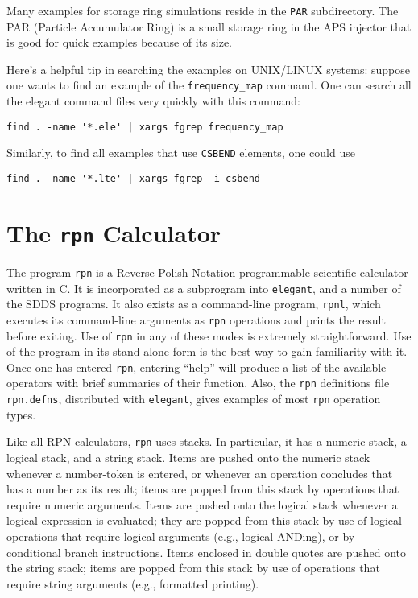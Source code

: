 \documentclass[11pt]{article}
\begin{document}
Many examples for storage ring simulations reside in the {\tt PAR} subdirectory.
The PAR (Particle Accumulator Ring) is a small storage ring in the APS injector
that is good for quick examples because of its size.

Here's a helpful tip in searching the examples on UNIX/LINUX systems: suppose one wants
to find an example of the \verb|frequency_map| command.  One can search all the elegant
command files very quickly with this command:
\begin{verbatim}
find . -name '*.ele' | xargs fgrep frequency_map
\end{verbatim}
Similarly, to find all examples that use \verb|CSBEND| elements, one could use
\begin{verbatim}
find . -name '*.lte' | xargs fgrep -i csbend
\end{verbatim}



\newpage
\section{The {\tt rpn} Calculator}

The program {\tt rpn} is a Reverse Polish Notation programmable
scientific calculator written in C.  It is incorporated as a
subprogram into {\tt elegant}, and a number of the SDDS programs.  It
also exists as a command-line program, {\tt rpnl}, which executes its
command-line arguments as {\tt rpn} operations and prints the result
before exiting.  Use of {\tt rpn} in any of these modes is extremely
straightforward.  Use of the program in its stand-alone form is the
best way to gain familiarity with it.  Once one has entered {\tt rpn},
entering ``help'' will produce a list of the available operators with
brief summaries of their function.  Also, the {\tt rpn} definitions
file \verb|rpn.defns|, distributed with {\tt elegant}, gives examples
of most {\tt rpn} operation types.

Like all RPN calculators, {\tt rpn} uses stacks.  In particular, it
has a numeric stack, a logical stack, and a string stack.  Items are
pushed onto the numeric stack whenever a number-token is entered, or
whenever an operation concludes that has a number as its result; items
are popped from this stack by operations that require numeric
arguments.  Items are pushed onto the logical stack whenever a logical
expression is evaluated; they are popped from this stack by use of
logical operations that require logical arguments (e.g., logical
ANDing), or by conditional branch instructions.  Items enclosed in
double quotes are pushed onto the string stack; items are popped from
this stack by use of operations that require string arguments (e.g.,
formatted printing).
\end{document}
